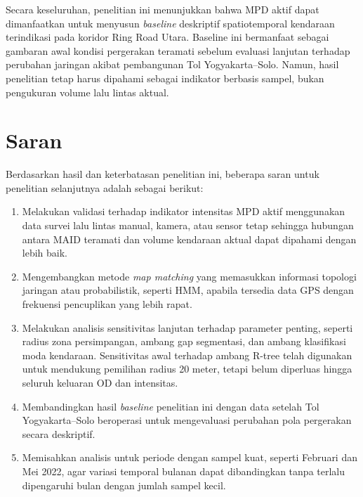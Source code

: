Secara keseluruhan, penelitian ini menunjukkan bahwa MPD aktif dapat dimanfaatkan untuk menyusun \textit{baseline} deskriptif spatiotemporal kendaraan terindikasi pada koridor Ring Road Utara. Baseline ini bermanfaat sebagai gambaran awal kondisi pergerakan teramati sebelum evaluasi lanjutan terhadap perubahan jaringan akibat pembangunan Tol Yogyakarta--Solo. Namun, hasil penelitian tetap harus dipahami sebagai indikator berbasis sampel, bukan pengukuran volume lalu lintas aktual.

\section{Saran}

Berdasarkan hasil dan keterbatasan penelitian ini, beberapa saran untuk penelitian selanjutnya adalah sebagai berikut:
\begin{enumerate}
    \item Melakukan validasi terhadap indikator intensitas MPD aktif menggunakan data survei lalu lintas manual, kamera, atau sensor tetap sehingga hubungan antara MAID teramati dan volume kendaraan aktual dapat dipahami dengan lebih baik.
    \item Mengembangkan metode \textit{map matching} yang memasukkan informasi topologi jaringan atau probabilistik, seperti HMM, apabila tersedia data GPS dengan frekuensi pencuplikan yang lebih rapat.
    \item Melakukan analisis sensitivitas lanjutan terhadap parameter penting, seperti radius zona persimpangan, ambang gap segmentasi, dan ambang klasifikasi moda kendaraan. Sensitivitas awal terhadap ambang R-tree telah digunakan untuk mendukung pemilihan radius 20 meter, tetapi belum diperluas hingga seluruh keluaran OD dan intensitas.
    \item Membandingkan hasil \textit{baseline} penelitian ini dengan data setelah Tol Yogyakarta--Solo beroperasi untuk mengevaluasi perubahan pola pergerakan secara deskriptif.
    \item Memisahkan analisis untuk periode dengan sampel kuat, seperti Februari dan Mei 2022, agar variasi temporal bulanan dapat dibandingkan tanpa terlalu dipengaruhi bulan dengan jumlah sampel kecil.

\end{enumerate}

